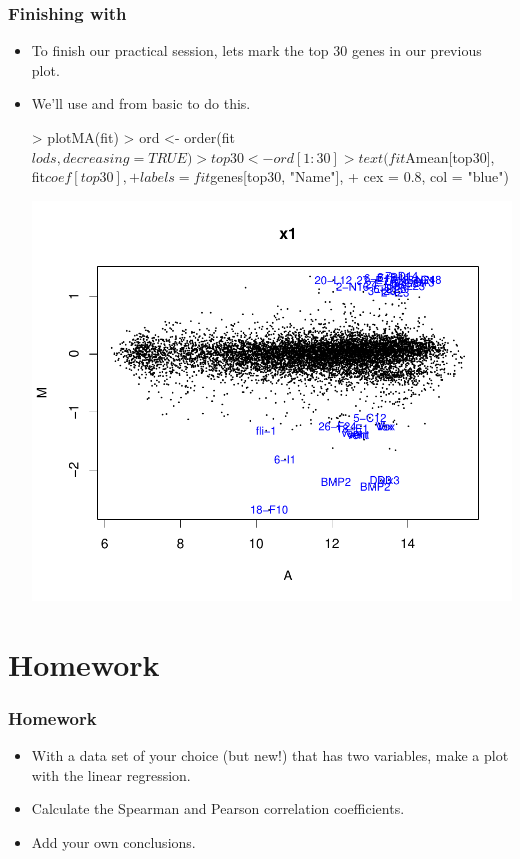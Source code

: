 \begin{frame}
  \frametitle{Finishing with }
  \begin{itemize}
  \item To finish our  practical session, lets mark the top 30 genes in our previous  plot.
  \item We'll use  and  from basic  to do this.
\begin{Schunk}
\begin{Sinput}
> plotMA(fit)
> ord <- order(fit$lods, decreasing = TRUE)
> top30 <- ord[1:30]
> text(fit$Amean[top30], fit$coef[top30], 
+     labels = fit$genes[top30, "Name"], 
+     cex = 0.8, col = "blue")
\end{Sinput}
\end{Schunk}
\includegraphics{plots/fig-037}
  \end{itemize}
\end{frame}

\section{Homework}
\begin{frame}[allowframebreaks]
  \frametitle{Homework}
  \begin{itemize}
  \item With a data set of your choice (but new!) that has two variables, make a plot with the linear regression.
  \item Calculate the Spearman and Pearson correlation coefficients.
  \item Add your own conclusions.
  \end{itemize}
\end{frame}


